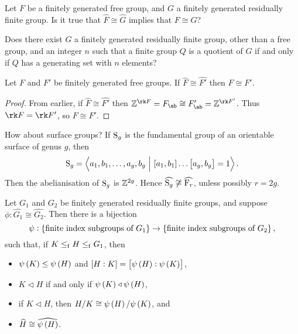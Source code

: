 \begin{question}
Let $ F $ be a finitely generated free group, and $ G $ a finitely generated residually finite group. Is it true that $ \widehat{F} \cong \widehat{G} $ implies that $ F \cong G $?
\end{question}

\begin{question}
Does there exist $ G $ a finitely generated residually finite group, other than a free group, and an integer $ n $ such that a finite group $ Q $ is a quotient of $ G $ if and only if $ Q $ has a generating set with $ n $ elements?
\end{question}

\pagebreak

\begin{proposition}
Let $ F $ and $ F' $ be finitely generated free groups. If $ \widehat{F} \cong \widehat{F'} $ then $ F \cong F' $.
\end{proposition}

\begin{proof}
From earlier, if $ \widehat{F} \cong \widehat{F'} $ then $ \ZZ^{\rk F} = F_{\ab} \cong F_{\ab}' = \ZZ^{\rk F'} $. Thus $ \rk F = \rk F' $, so $ F \cong F' $.
\end{proof}

How about surface groups? If $ \S_g $ is the fundamental group of an orientable surface of genus $ g $, then
$$ \S_g = \abr{a_1, b_1, \dots, a_g, b_g \st \sbr{a_1, b_1} \dots \sbr{a_g, b_g} = 1}. $$
Then the abelianisation of $ \S_g $ is $ \ZZ^{2g} $. Hence $ \widehat{\S_g} \not\cong \widehat{\F_r} $, unless possibly $ r = 2g $.

\begin{theorem}
Let $ G_1 $ and $ G_2 $ be finitely generated residually finite groups, and suppose $ \phi : \widehat{G_1} \cong \widehat{G_2} $. Then there is a bijection
$$ \psi : \cbr{\text{finite index subgroups of} \ G_1} \to \cbr{\text{finite index subgroups of} \ G_2}, $$
such that, if $ K \le_\f H \le_\f G_1 $, then
\begin{itemize}
\item $ \psi\br{K} \le \psi\br{H} $ and $ \sbr{H : K} = \sbr{\psi\br{H} : \psi\br{K}} $,
\item $ K \triangleleft H $ if and only if $ \psi\br{K} \triangleleft \psi\br{H} $,
\item if $ K \triangleleft H $, then $ H / K \cong \psi\br{H} / \psi\br{K} $, and
\item $ \widehat{H} \cong \widehat{\psi\br{H}} $.
\end{itemize}
\end{theorem}

